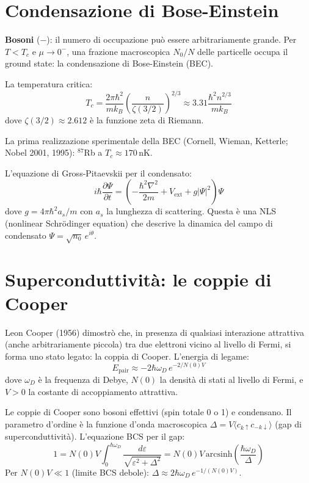 \documentclass[11.5pt,a4paper,openany]{book}
\theoremstyle{remark}
\begin{document}
\section{Condensazione di Bose-Einstein}

\textbf{Bosoni} ($-$): il numero di occupazione può essere arbitrariamente grande. Per $T < T_c$ e $\mu \to 0^-$, una frazione macroscopica $N_0/N$ delle particelle occupa il ground state: la condensazione di Bose-Einstein (BEC).

La temperatura critica:
\[
T_c = \frac{2\pi\hbar^2}{mk_B}\left(\frac{n}{\zeta(3/2)}\right)^{2/3} \approx 3.31 \frac{\hbar^2 n^{2/3}}{mk_B}
\]
dove $\zeta(3/2) \approx 2.612$ è la funzione zeta di Riemann.

La prima realizzazione sperimentale della BEC (Cornell, Wieman, Ketterle; Nobel 2001, 1995): $^{87}$Rb a $T_c \approx 170\,\mathrm{nK}$.

L'equazione di Gross-Pitaevskii per il condensato:
\[
i\hbar\frac{\partial\Psi}{\partial t} = \left(-\frac{\hbar^2\nabla^2}{2m} + V_{\text{ext}} + g|\Psi|^2\right)\Psi
\]
dove $g = 4\pi\hbar^2 a_s/m$ con $a_s$ la lunghezza di scattering. Questa è una NLS (nonlinear Schrödinger equation) che descrive la dinamica del campo di condensato $\Psi = \sqrt{n_0}\,e^{i\theta}$.

\section{Superconduttività: le coppie di Cooper}

Leon Cooper (1956) dimostrò che, in presenza di qualsiasi interazione attrattiva (anche arbitrariamente piccola) tra due elettroni vicino al livello di Fermi, si forma uno stato legato: la coppia di Cooper. L'energia di legame:
\[
E_{\text{pair}} \approx -2\hbar\omega_D\,e^{-2/N(0)V}
\]
dove $\omega_D$ è la frequenza di Debye, $N(0)$ la densità di stati al livello di Fermi, e $V > 0$ la costante di accoppiamento attrattiva.

Le coppie di Cooper sono bosoni effettivi (spin totale 0 o 1) e condensano. Il parametro d'ordine è la funzione d'onda macroscopica $\Delta = V\langle c_{k\uparrow} c_{-k\downarrow}\rangle$ (gap di superconduttività). L'equazione BCS per il gap:
\[
1 = N(0)V \int_0^{\hbar\omega_D} \frac{d\varepsilon}{\sqrt{\varepsilon^2 + \Delta^2}} = N(0)V\, \text{arcsinh}\!\left(\frac{\hbar\omega_D}{\Delta}\right)
\]
Per $N(0)V \ll 1$ (limite BCS debole): $\Delta \approx 2\hbar\omega_D\,e^{-1/(N(0)V)}$.
\end{document}
